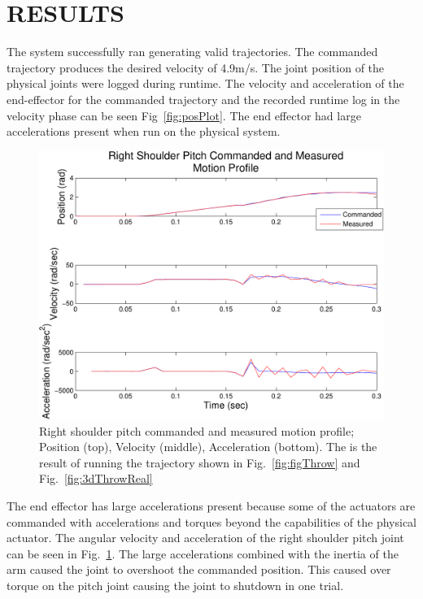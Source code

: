 \section{RESULTS}
The system successfully ran generating valid trajectories.    The commanded trajectory produces the desired velocity of 4.9m/s.  The joint position of the physical joints were logged during runtime.  The velocity and acceleration of the end-effector for the commanded trajectory and the recorded runtime log in the velocity phase can be seen Fig~\ref{fig:posPlot}.  The end effector had large accelerations present when run on the physical system.  

\begin{figure}[thpb]\label{fig:velosPlot}
  \centering
\includegraphics[width=1.0\columnwidth]{./MATLAB/throwTrajRSPplot.pdf}
  \caption{Right shoulder pitch commanded and measured motion profile; Position (top), Velocity (middle), Acceleration (bottom).  The is the result of running the trajectory shown in Fig.~\ref{fig:figThrow} and Fig.~\ref{fig:3dThrowReal}}
\end{figure}


The end effector has large accelerations present because some of the actuators are commanded with accelerations and torques beyond the capabilities of the physical actuator.  The angular velocity and acceleration of the right shoulder pitch joint can be seen in Fig.~\ref{fig:velosPlot}.  The large accelerations combined with the inertia of the arm caused the joint to overshoot the commanded position.  This caused over torque on the pitch joint causing the joint to shutdown in one trial.



